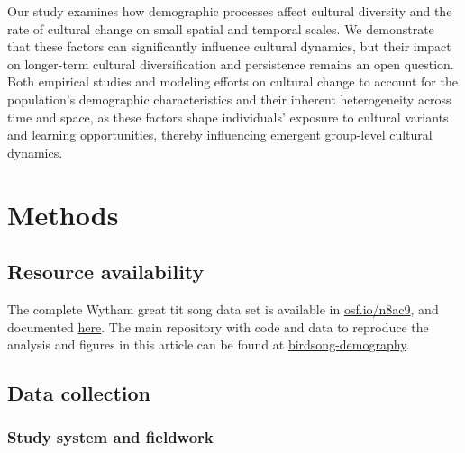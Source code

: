 \documentclass[9pt, onecolumn, twoside, lineno]{gsajnl}
\begin{document}
Our study examines how demographic processes affect cultural diversity and the rate of cultural change on small spatial and temporal scales. We demonstrate that these factors can significantly influence cultural dynamics, but their impact on longer-term cultural diversification and persistence remains an open question. Both empirical studies and modeling efforts on cultural change to account for the population's demographic characteristics and their inherent heterogeneity across time and space, as these factors shape individuals' exposure to cultural variants and learning opportunities, thereby influencing emergent group-level cultural dynamics.

\section{Methods}
\label{sc:methods}

\subsection{Resource availability}

The complete Wytham great tit song data set is available in \href{https://osf.io/n8ac9}{osf.io/n8ac9}, and documented \href{https://nilomr.github.io/great-tit-hits/}{here}. The main repository with code and data to reproduce the analysis and figures in this article can be found at \href{http://github.com/nilomr/birdsong-demography}{birdsong-demography}.

\subsection{Data collection}

\subsubsection{Study system and fieldwork}
\end{document}

